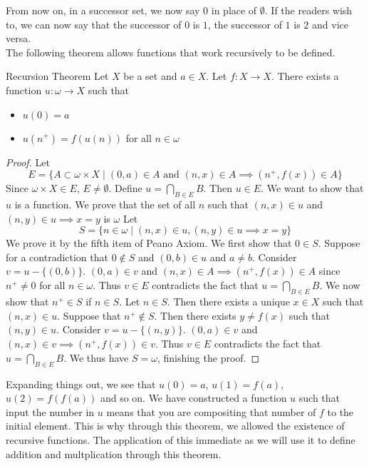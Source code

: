 \documentclass[a4paper]{article}
\begin{document}
From now on, in a successor set, we now say $0$ in place of $\emptyset$. If the readers wish to, we can now say that the successor of $0$ is $1$, the successor of $1$ is $2$ and vice versa. \\

The following theorem allows functions that work recursively to be defined. 

\begin{thm}{Recursion Theorem}{} Let $X$ be a set and $a\in X$. Let $f:X\to X$. There exists a function $u:\omega\to X$ such that
\begin{itemize}
\item $u(0)=a$
\item $u(n^+)=f(u(n))$ for all $n\in\omega$
\end{itemize}
\begin{proof} Let $$E=\{A\subset\omega\times X\;|\;(0,a)\in A\text{ and }(n,x)\in A\implies (n^+,f(x))\in A\}$$ Since $\omega\times X\in E$, $E\neq\emptyset$. Define $u=\bigcap_{B\in E}B$. Then $u\in E$. We want to show that $u$ is a function. We prove that the set of all $n$ such that $(n,x)\in u$ and $(n,y)\in u\implies x=y$ is $\omega$ Let $$S=\{n\in\omega\;|\;(n,x)\in u,(n,y)\in u\implies x=y\}$$ We prove it by the fifth item of Peano Axiom. \linebreak\linebreak
We first show that $0\in S$. Suppose for a contradiction that $0\notin S$ and $(0,b)\in u$ and $a\neq b$. Consider $v=u-\{(0,b)\}$. $(0,a)\in v$ and $(n,x)\in A\implies (n^+,f(x))\in A$ since $n^+\neq 0$ for all $n\in\omega$. Thus $v\in E$ contradicts the fact that $u=\bigcap_{B\in E}B$. \linebreak\linebreak
We now show that $n^+\in S$ if $n\in S$. Let $n\in S$. Then there exists a unique $x\in X$ such that $(n,x)\in u$. Suppose that $n^+\notin S$. Then there exists $y\neq f(x)$ such that $(n,y)\in u$. Consider $v=u-\{(n,y)\}$. $(0,a)\in v$ and $(n,x)\in v\implies (n^+,f(x))\in v$. Thus $v\in E$ contradicts the fact that $u=\bigcap_{B\in E}B$. We thus have $S=\omega$, finishing the proof. 
\end{proof}
\end{thm}

Expanding things out, we see that $u(0)=a$, $u(1)=f(a)$, $u(2)=f(f(a))$ and so on. We have constructed a function $u$ such that input the number in $u$ means that you are compositing that number of $f$ to the initial element. This is why through this theorem, we allowed the existence of recursive functions. The application of this immediate as we will use it to define addition and multplication through this theorem. 
\end{document}
